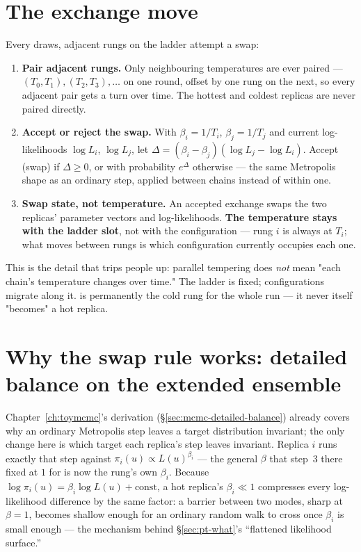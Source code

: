 \section{The exchange move}
\label{sec:pt-algorithm}

Every  draws, adjacent rungs on the ladder attempt a swap:

\begin{enumerate}
  \item \textbf{Pair adjacent rungs.} Only neighbouring temperatures are ever paired
        --- $(T_0,T_1), (T_2,T_3), \ldots$ on one round, offset by one rung on the
        next, so every adjacent pair gets a turn over time. The hottest and coldest
        replicas are never paired directly.
  \item \textbf{Accept or reject the swap.} With $\beta_i=1/T_i$, $\beta_j=1/T_j$ and
        current log-likelihoods $\log L_i$, $\log L_j$, let
        $\Delta = (\beta_i-\beta_j)(\log L_j-\log L_i)$. Accept (swap) if
        $\Delta \geq 0$, or with probability $e^{\Delta}$ otherwise --- the same
        Metropolis shape as an ordinary step, applied between chains instead of within
        one.
  \item \textbf{Swap state, not temperature.} An accepted exchange swaps the two
        replicas' parameter vectors and log-likelihoods. \textbf{The temperature stays
        with the ladder slot}, not with the configuration --- rung $i$ is always at
        $T_i$; what moves between rungs is which configuration currently occupies
        each one.
\end{enumerate}

\begin{jnote}
This is the detail that trips people up: parallel tempering does \emph{not} mean
"each chain's temperature changes over time." The ladder is fixed; configurations
migrate along it.   is permanently the cold rung for the
whole run --- it never itself "becomes" a hot replica.
\end{jnote}

\section{Why the swap rule works: detailed balance on the extended ensemble}
\label{sec:pt-detailed-balance}

Chapter~\ref{ch:toymcmc}'s derivation (\S\ref{sec:mcmc-detailed-balance}) already
covers why an ordinary Metropolis step leaves a target distribution invariant; the
only change here is which target each replica's step leaves invariant. Replica $i$
runs exactly that step against $\pi_i(u) \propto L(u)^{\beta_i}$ --- the general
$\beta$ that step~3 there fixed at $1$ for  is now the rung's own
$\beta_i$. Because $\log \pi_i(u) = \beta_i \log L(u) + \text{const}$, a hot
replica's $\beta_i \ll 1$ compresses every log-likelihood difference by the same
factor: a barrier between two modes, sharp at $\beta=1$, becomes shallow enough for
an ordinary random walk to cross once $\beta_i$ is small enough --- the mechanism
behind \S\ref{sec:pt-what}'s ``flattened likelihood surface.''

